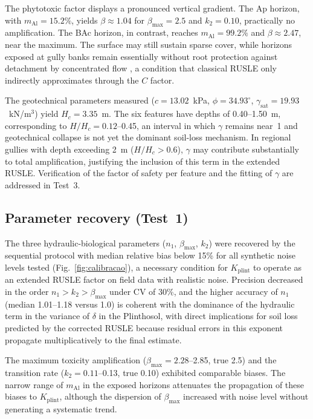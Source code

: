 \documentclass[preprint,review,12pt,authoryear]{elsarticle}
\begin{document}
The phytotoxic factor displays a pronounced vertical gradient. The Ap horizon, with $m_{\mathrm{Al}} = 15.2\%$, yields $\beta \approx 1.04$ for $\beta_{\max} = 2.5$ and $k_2 = 0.10$, practically no amplification. The BAc horizon, in contrast, reaches $m_{\mathrm{Al}} = 99.2\%$ and $\beta \approx 2.47$, near the maximum. The surface may still sustain sparse cover, while horizons exposed at gully banks remain essentially without root protection against detachment by concentrated flow \citep{vannoppen_2015}, a condition that classical RUSLE only indirectly approximates through the $C$ factor.

The geotechnical parameters measured ($c = 13.02$~kPa, $\phi = 34.93^\circ$, $\gamma_{\mathrm{sat}} = 19.93$~kN/m$^3$) yield $H_c = 3.35$~m. The six features have depths of 0.40--1.50~m, corresponding to $H/H_c = 0.12$--0.45, an interval in which $\gamma$ remains near~1 and geotechnical collapse is not yet the dominant soil-loss mechanism. In regional gullies with depth exceeding 2~m ($H/H_c > 0.6$), $\gamma$ may contribute substantially to total amplification, justifying the inclusion of this term in the extended RUSLE. Verification of the factor of safety per feature and the fitting of $\gamma$ are addressed in Test~3.

\subsection{Parameter recovery (Test~1)}

The three hydraulic-biological parameters ($n_1$, $\beta_{\max}$, $k_2$) were recovered by the sequential protocol with median relative bias below 15\% for all synthetic noise levels tested (Fig.~\ref{fig:calibracao}), a necessary condition for $K_{\mathrm{plint}}$ to operate as an extended RUSLE factor on field data with realistic noise. Precision decreased in the order $n_1 > k_2 > \beta_{\max}$ under CV of 30\%, and the higher accuracy of $n_1$ (median 1.01--1.18 versus 1.0) is coherent with the dominance of the hydraulic term in the variance of $\delta$ in the Plinthosol, with direct implications for soil loss predicted by the corrected RUSLE because residual errors in this exponent propagate multiplicatively to the final estimate.

The maximum toxicity amplification ($\beta_{\max} = 2.28$--2.85, true 2.5) and the transition rate ($k_2 = 0.11$--0.13, true 0.10) exhibited comparable biases. The narrow range of $m_{\mathrm{Al}}$ in the exposed horizons attenuates the propagation of these biases to $K_{\mathrm{plint}}$, although the dispersion of $\beta_{\max}$ increased with noise level without generating a systematic trend.
\end{document}
